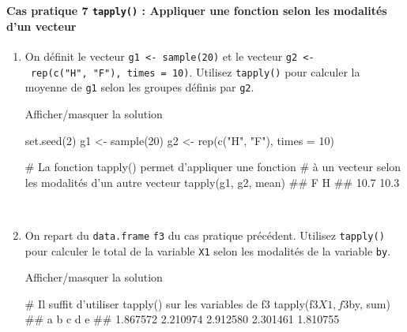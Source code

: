 \documentclass[12pt,]{article}
\newenvironment{Shaded}{}{}
\newcommand{\KeywordTok}[1]{\textcolor[rgb]{0.00,0.00,1.00}{{#1}}}
\newcommand{\DataTypeTok}[1]{{#1}}
\newcommand{\DecValTok}[1]{{#1}}
\newcommand{\StringTok}[1]{\textcolor[rgb]{0.00,0.50,0.50}{{#1}}}
\newcommand{\CommentTok}[1]{\textcolor[rgb]{0.00,0.50,0.00}{{#1}}}
\newcommand{\NormalTok}[1]{{#1}}
\let\oldparagraph\paragraph
\renewcommand{\paragraph}[1]{\oldparagraph{#1}\mbox{}}
\begin{document}
~

\paragraph{\texorpdfstring{\textbf{Cas pratique 7} \texttt{tapply()} :
Appliquer une fonction selon les modalités d'un
vecteur}{Cas pratique 7 tapply() : Appliquer une fonction selon les modalités d'un vecteur}}\label{cas-pratique-7-tapply-appliquer-une-fonction-selon-les-modalites-dun-vecteur}

\begin{enumerate}
\def\labelenumi{\alph{enumi}.}
\item
  On définit le vecteur \texttt{g1\ \textless{}-\ sample(20)} et le
  vecteur \texttt{g2\ \textless{}-\ rep(c("H",\ "F"),\ times\ =\ 10)}.
  Utilisez \texttt{tapply()} pour calculer la moyenne de \texttt{g1}
  selon les groupes définis par \texttt{g2}.

  Afficher/masquer la solution

  \hypertarget{sol26}{}
\begin{Shaded}
\begin{Highlighting}[]
\KeywordTok{set.seed}\NormalTok{(}\DecValTok{2}\NormalTok{)}
\NormalTok{g1 <-}\StringTok{ }\KeywordTok{sample}\NormalTok{(}\DecValTok{20}\NormalTok{)}
\NormalTok{g2 <-}\StringTok{ }\KeywordTok{rep}\NormalTok{(}\KeywordTok{c}\NormalTok{(}\StringTok{"H"}\NormalTok{, }\StringTok{"F"}\NormalTok{), }\DataTypeTok{times =} \DecValTok{10}\NormalTok{)}

\CommentTok{# La fonction tapply() permet d'appliquer une fonction}
\CommentTok{# à un vecteur selon les modalités d'un autre vecteur}
\KeywordTok{tapply}\NormalTok{(g1, g2, mean)}
\NormalTok{##    F    H }
\NormalTok{## 10.7 10.3}
\end{Highlighting}
\end{Shaded}

  ~
\item
  On repart du \texttt{data.frame} \texttt{f3} du cas pratique
  précédent. Utilisez \texttt{tapply()} pour calculer le total de la
  variable \texttt{X1} selon les modalités de la variable \texttt{by}.

  Afficher/masquer la solution

  \hypertarget{sol27}{}
\begin{Shaded}
\begin{Highlighting}[]
\CommentTok{# Il suffit d'utiliser tapply() sur les variables de f3}
\KeywordTok{tapply}\NormalTok{(f3$X1, f3$by, sum)}
\NormalTok{##        a        b        c        d        e }
\NormalTok{## 1.867572 2.210974 2.912580 2.301461 1.810755}
\end{Highlighting}
\end{Shaded}


\end{enumerate}
\end{document}
